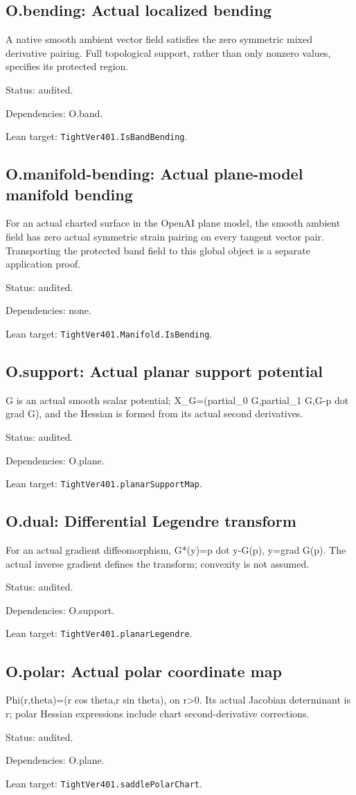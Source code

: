 \documentclass{article}
\begin{document}
\subsection*{O.bending: Actual localized bending}
A native smooth ambient vector field satisfies the zero symmetric mixed derivative pairing. Full topological support, rather than only nonzero values, specifies its protected region.
\par Status: audited.
\par Dependencies: O.band.
\par Lean target: \texttt{TightVer401.IsBandBending}.
\subsection*{O.manifold-bending: Actual plane-model manifold bending}
For an actual charted surface in the OpenAI plane model, the smooth ambient field has zero actual symmetric strain pairing on every tangent vector pair. Transporting the protected band field to this global object is a separate application proof.
\par Status: audited.
\par Dependencies: none.
\par Lean target: \texttt{TightVer401.Manifold.IsBending}.
\subsection*{O.support: Actual planar support potential}
G is an actual smooth scalar potential; X\_G=(partial\_0 G,partial\_1 G,G-p dot grad G), and the Hessian is formed from its actual second derivatives.
\par Status: audited.
\par Dependencies: O.plane.
\par Lean target: \texttt{TightVer401.planarSupportMap}.
\subsection*{O.dual: Differential Legendre transform}
For an actual gradient diffeomorphism, G*(y)=p dot y-G(p), y=grad G(p). The actual inverse gradient defines the transform; convexity is not assumed.
\par Status: audited.
\par Dependencies: O.support.
\par Lean target: \texttt{TightVer401.planarLegendre}.
\subsection*{O.polar: Actual polar coordinate map}
Phi(r,theta)=(r cos theta,r sin theta), on r>0. Its actual Jacobian determinant is r; polar Hessian expressions include chart second-derivative corrections.
\par Status: audited.
\par Dependencies: O.plane.
\par Lean target: \texttt{TightVer401.saddlePolarChart}.
\end{document}
